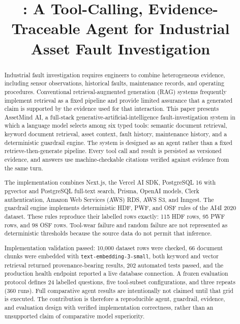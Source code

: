\documentclass[conference]{IEEEtran}
\title{\system: A Tool-Calling, Evidence-Traceable Agent for Industrial Asset Fault Investigation}
\author{
\IEEEauthorblockN{\todo{Student Name}}
\IEEEauthorblockA{
\todo{Department or Programme}\\
IILM University\\
\todo{City, Country}\\
\todo{institutional email}}
}
\newcommand{\system}{AssetMind AI}
\begin{document}
\maketitle

\begin{abstract}
Industrial fault investigation requires engineers to combine heterogeneous
evidence, including sensor observations, historical faults, maintenance
records, and operating procedures. Conventional retrieval-augmented
generation (RAG) systems frequently implement retrieval as a fixed pipeline
and provide limited assurance that a generated claim is supported by the
evidence used for that interaction. This paper presents \system, a
full-stack generative-artificial-intelligence fault-investigation system in
which a language model selects among six typed tools: semantic document
retrieval, keyword document retrieval, asset context, fault history,
maintenance history, and a deterministic guardrail engine. The system is
designed as an agent rather than a fixed retrieve-then-generate pipeline.
Every tool call and result is persisted as versioned evidence, and answers use
machine-checkable citations verified against evidence from the same turn.

The implementation combines Next.js, the Vercel AI SDK, PostgreSQL 16 with
pgvector and PostgreSQL full-text search, Prisma, OpenAI models, Clerk
authentication, Amazon Web Services (AWS) RDS, AWS S3, and Inngest. The
guardrail engine implements deterministic HDF, PWF, and OSF rules of the AI4I
2020 dataset. These rules reproduce their labelled rows exactly: 115 HDF
rows, 95 PWF rows, and 98 OSF rows. Tool-wear failure and random failure are
not represented as deterministic thresholds because the source data do not
permit that inference.

Implementation validation passed: 10,000 dataset rows were checked, 66
document chunks were embedded with \texttt{text-embedding-3-small}, both
keyword and vector retrieval returned provenance-bearing results, 202
automated tests passed, and the production health endpoint reported a live
database connection. A frozen evaluation protocol defines 24 labelled
questions, five tool-subset configurations, and three repeats (360 runs).
Full comparative agent results are intentionally not claimed until that grid
is executed. The contribution is therefore a reproducible agent,
guardrail, evidence, and evaluation design with verified implementation
correctness, rather than an unsupported claim of comparative model
superiority.
\end{abstract}
\end{document}

